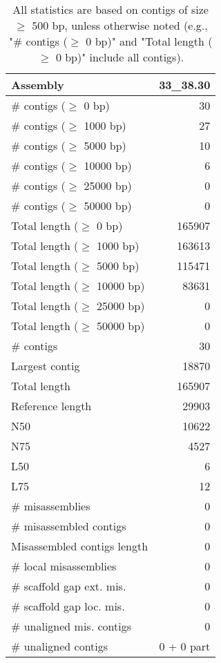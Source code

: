 \documentclass[12pt,a4paper]{article}
\begin{document}
\begin{table}[ht]
\begin{center}
\caption{All statistics are based on contigs of size $\geq$ 500 bp, unless otherwise noted (e.g., "\# contigs ($\geq$ 0 bp)" and "Total length ($\geq$ 0 bp)" include all contigs).}
\begin{tabular}{|l*{1}{|r}|}
\hline
Assembly & 33\_38.30 \\ \hline
\# contigs ($\geq$ 0 bp) & 30 \\ \hline
\# contigs ($\geq$ 1000 bp) & 27 \\ \hline
\# contigs ($\geq$ 5000 bp) & 10 \\ \hline
\# contigs ($\geq$ 10000 bp) & 6 \\ \hline
\# contigs ($\geq$ 25000 bp) & 0 \\ \hline
\# contigs ($\geq$ 50000 bp) & 0 \\ \hline
Total length ($\geq$ 0 bp) & 165907 \\ \hline
Total length ($\geq$ 1000 bp) & 163613 \\ \hline
Total length ($\geq$ 5000 bp) & 115471 \\ \hline
Total length ($\geq$ 10000 bp) & 83631 \\ \hline
Total length ($\geq$ 25000 bp) & 0 \\ \hline
Total length ($\geq$ 50000 bp) & 0 \\ \hline
\# contigs & 30 \\ \hline
Largest contig & 18870 \\ \hline
Total length & 165907 \\ \hline
Reference length & 29903 \\ \hline
N50 & 10622 \\ \hline
N75 & 4527 \\ \hline
L50 & 6 \\ \hline
L75 & 12 \\ \hline
\# misassemblies & 0 \\ \hline
\# misassembled contigs & 0 \\ \hline
Misassembled contigs length & 0 \\ \hline
\# local misassemblies & 0 \\ \hline
\# scaffold gap ext. mis. & 0 \\ \hline
\# scaffold gap loc. mis. & 0 \\ \hline
\# unaligned mis. contigs & 0 \\ \hline
\# unaligned contigs & 0 + 0 part \\ \hline

\end{tabular}
\end{center}
\end{table}
\end{document}

